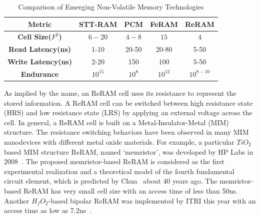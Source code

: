 \begin{table}[!tb]
  \centering
  \scriptsize
    \scriptsize
  \caption{Comparison of Emerging Non-Volatile Memory Technologies}\label{table:compare}
  \vspace{-0pt}
  \begin{tabular}{|c|cccc|}
    \hline
    \textbf{Metric} & \textbf{STT-RAM} & \textbf{PCM}    & \textbf{FeRAM} & \textbf{ReRAM}
    \\\hline
    \textbf{Cell Size($F^2$)} & $6-20$ & $4-8$ & $15$ & $4$\\\hline
    \textbf{Read Latency(ns)} &  1-10 & 20-50 & 20-80 & 5-50\\\hline
    \textbf{Write Latency(ns)} & 2-20& 150& 100& 5-50\\\hline
    \textbf{Endurance} &  $10^{15}$ & $10^8$ & $10^{12}$ & $10^{8-10}$\\\hline
  \end{tabular}
  \vspace{-5pt}
\end{table}


As implied by the name, an ReRAM cell uses its resistance to represent the stored information. A ReRAM cell can be switched between high resistance state (HRS) and low resistance state (LRS) by applying an external voltage across the cell.
In general, a ReRAM cell is built on a Metal-Insulator-Metal (MIM) structure. The resistance switching behaviors have been observed in many MIM nanodevices with different metal oxide materials. For example, a particular $TiO_2$ based MIM structure ReRAM, named `memristor', was developed by HP Labs in 2008~\cite{memristor:missing}. The proposed memristor-based ReRAM is considered as the first experimental realization and a theoretical model of the fourth fundamental circuit element, which is predicted by Chua~\cite{memristor:chua} about 40 years ago. The memristor-based ReRAM has very small cell size with an access time of less than 50ns. %
Another $H_fO_2$-based bipolar ReRAM was implemented by ITRI this year with an access time as low as 7.2ns~\cite{ReRAM_ISSCC2011_Sheu}.

